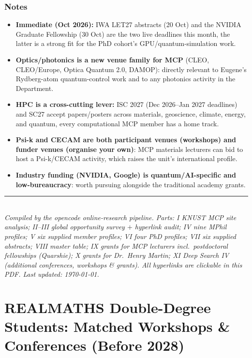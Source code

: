 \documentclass[11pt,a4paper]{article}
\begin{document}
\section{Notes}

\begin{itemize}[leftmargin=1.4em]
  \item \textbf{Immediate (Oct 2026):} IWA LET27 abstracts (20 Oct) and the NVIDIA Graduate Fellowship (30 Oct) are the two live deadlines this month, the latter is a strong fit for the PhD cohort's GPU/quantum-simulation work.
  \item \textbf{Optics/photonics is a new venue family for MCP} (CLEO, CLEO/Europe, Optica Quantum 2.0, DAMOP): directly relevant to Eugene's Rydberg-atom quantum-control work and to any photonics activity in the Department.
  \item \textbf{HPC is a cross-cutting lever:} ISC 2027 (Dec 2026--Jan 2027 deadlines) and SC27 accept papers/posters across materials, geoscience, climate, energy, and quantum, every computational MCP member has a home track.
  \item \textbf{Psi-k and CECAM are both participant venues (workshops) and funder venues (organise your own)}: MCP materials lecturers can bid to host a Psi-k/CECAM activity, which raises the unit's international profile.
  \item \textbf{Industry funding (NVIDIA, Google) is quantum/AI-specific and low-bureaucracy}: worth pursuing alongside the traditional academy grants.
\end{itemize}

\bigskip
\noindent\rule{\textwidth}{0.4pt}\\
\small\emph{Compiled by the opencode online-research pipeline. Parts: I KNUST MCP site analysis; II--III global opportunity survey $+$ hyperlink audit; IV nine MPhil profiles; V six supplied member profiles; VI four PhD profiles; VII six supplied abstracts; VIII master table; IX grants for MCP lecturers incl.\ postdoctoral fellowships (Quarshie); X grants for Dr.\ Henry Martin; XI Deep Search IV (additional conferences, workshops \& grants). All hyperlinks are clickable in this PDF. Last updated: \today.}



\newpage
\part{REALMATHS Double-Degree Students: Matched Workshops \& Conferences (Before 2028)}
\label{part:realmaths}
\end{document}
